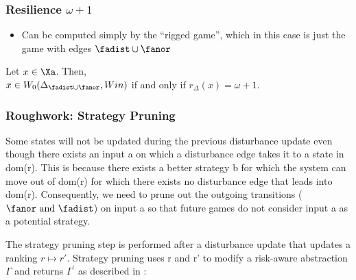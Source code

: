 \subsubsection{Resilience $\omega + 1$}

\begin{itemize}
	\item Can be computed simply by the ``rigged game'', which in this case is just the game with edges $\fadist \cup \fanor$
\end{itemize}

\begin{lemma}
Let $x \in \Xa$. 
Then, \\ $x \in W_0(\Delta_{\fadist \cup \fanor}, Win)$ if and only if $r_\Delta(x) = \omega+1$.
\end{lemma}

\clearpage
\subsubsection{Roughwork: Strategy Pruning}
	Some states will not be updated during the previous disturbance update even though there exists an input a on which a disturbance edge takes it to a state in dom(r). This is because there exists a better strategy b for which the system can move out of dom(r) for which there exists no disturbance edge that leads into dom(r).  Consequently, we need to prune out the outgoing transitions ($ \fanor \text{ and } \fadist$) on input a so that future games do not consider input a as a potential strategy.
	
	
	The strategy pruning step is performed after a disturbance update that updates a ranking $ r \mapsto r'$. Strategy pruning uses r and r' to modify a risk-aware abstraction $\Gamma$ and returns $\Gamma^{'}$ as described in \cite{alg:strategy_pruning}:
	


